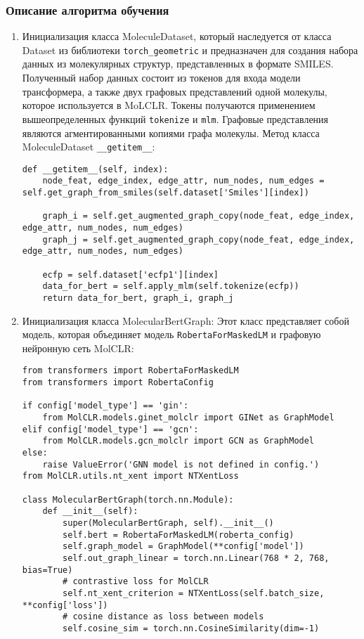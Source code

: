 \subsubsection{Описание алгоритма обучения}
\begin{enumerate}
    \item Инициализация класса MoleculeDataset, который наследуется от класса Dataset из библиотеки \texttt{torch\_geometric} и предназначен для создания набора данных из молекулярных структур, представленных в формате SMILES. Полученный набор данных состоит из токенов для входа модели трансформера, а также двух графовых представлений одной молекулы, которое используется в MoLCLR. Токены получаются применением вышеопределенных функций \texttt{tokenize} и \texttt{mlm}. Графовые представления являются агментированными копиями графа молекулы. 
    Метод класса MoleculeDataset \texttt{\_\_getitem\_\_}:
    \begin{lstlisting}
def __getitem__(self, index):
    node_feat, edge_index, edge_attr, num_nodes, num_edges = self.get_graph_from_smiles(self.dataset['Smiles'][index])

    graph_i = self.get_augmented_graph_copy(node_feat, edge_index, edge_attr, num_nodes, num_edges)
    graph_j = self.get_augmented_graph_copy(node_feat, edge_index, edge_attr, num_nodes, num_edges)

    ecfp = self.dataset['ecfp1'][index]
    data_for_bert = self.apply_mlm(self.tokenize(ecfp))
    return data_for_bert, graph_i, graph_j
    \end{lstlisting}
    \item Инициализация класса MolecularBertGraph: Этот класс представляет собой модель, которая объединяет модель \texttt{RobertaForMaskedLM} и графовую нейронную сеть MolCLR:
    \begin{lstlisting}
from transformers import RobertaForMaskedLM
from transformers import RobertaConfig

if config['model_type'] == 'gin':
    from MolCLR.models.ginet_molclr import GINet as GraphModel
elif config['model_type'] == 'gcn':
    from MolCLR.models.gcn_molclr import GCN as GraphModel
else:
    raise ValueError('GNN model is not defined in config.')
from MolCLR.utils.nt_xent import NTXentLoss

class MolecularBertGraph(torch.nn.Module):
    def __init__(self):
        super(MolecularBertGraph, self).__init__()
        self.bert = RobertaForMaskedLM(roberta_config)
        self.graph_model = GraphModel(**config['model'])
        self.out_graph_linear = torch.nn.Linear(768 * 2, 768, bias=True)
        # contrastive loss for MolCLR
        self.nt_xent_criterion = NTXentLoss(self.batch_size, **config['loss'])
        # cosine distance as loss between models
        self.cosine_sim = torch.nn.CosineSimilarity(dim=-1)


\end{lstlisting}
\end{enumerate}
